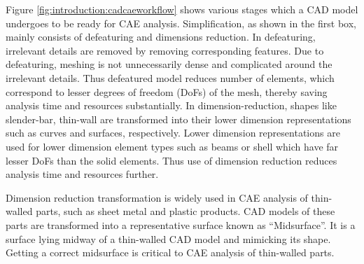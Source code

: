 Figure \ref{fig:introduction:cadcaeworkflow} shows various stages which a CAD model undergoes to be ready for CAE analysis. Simplification, as shown in the first box, mainly consists of defeaturing and dimensions reduction. In defeaturing, irrelevant details are removed by removing corresponding features. Due to defeaturing, meshing is not unnecessarily dense and complicated around the irrelevant details. Thus defeatured model reduces number of elements, which correspond to lesser degrees of freedom (DoFs) of the mesh, thereby saving analysis time and resources substantially.  In dimension-reduction, shapes like slender-bar, thin-wall are transformed into their lower dimension representations such as curves and surfaces, respectively. Lower dimension representations are used for lower dimension element types such as beams or shell which have far lesser DoFs than the solid elements. Thus use of dimension reduction reduces analysis time and resources further.

Dimension reduction transformation is widely used in CAE analysis of thin-walled parts, such as sheet metal and plastic products.  CAD models of these parts are transformed into a representative surface known as ``Midsurface''. It is a surface lying midway of a thin-walled CAD model and mimicking its shape.  Getting a correct midsurface is critical to CAE analysis of thin-walled parts.
%
	
